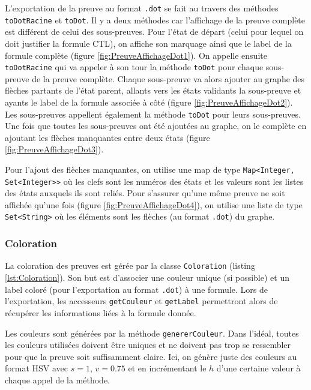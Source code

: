 \documentclass[dvipsnames]{report}
\begin{document}
L'exportation de la preuve au format \texttt{.dot} se fait au travers des méthodes \texttt{toDotRacine} et \texttt{toDot}. Il y a deux méthodes car l'affichage de la preuve complète est différent de celui des sous-preuves. Pour l'état de départ (celui pour lequel on doit justifier la formule CTL), on affiche son marquage ainsi que le label de la formule complète (figure \ref{fig:PreuveAffichageDot1}). On appelle ensuite \texttt{toDotRacine} qui va appeler à son tour la méthode \texttt{toDot} pour chaque sous-preuve de la preuve complète. Chaque sous-preuve va alors ajouter au graphe des flèches partants de l'état parent, allants vers les états validants la sous-preuve et ayants le label de la formule associée à côté (figure \ref{fig:PreuveAffichageDot2}). Les sous-preuves appellent également la méthode \texttt{toDot} pour leurs sous-preuves. Une fois que toutes les sous-preuves ont été ajoutées au graphe, on le complète en ajoutant les flèches manquantes entre deux états (figure \ref{fig:PreuveAffichageDot3}).



Pour l'ajout des flèches manquantes, on utilise une map de type \texttt{Map<Integer, {Set<Integer>}>} où les clefs sont les numéros des états et les valeurs sont les listes des états auxquels ils sont reliés. Pour s'assurer qu'une même preuve ne soit affichée qu'une fois (figure \ref{fig:PreuveAffichageDot4}), on utilise une liste de type \texttt{Set<String>} où les éléments sont les flèches (au format \texttt{.dot}) du graphe.



\subsubsection{Coloration}

La coloration des preuves est gérée par la classe \texttt{Coloration} (listing \ref{lst:Coloration}). Son but est d'associer une couleur unique (si possible) et un label coloré (pour l'exportation au format \texttt{.dot}) à une formule. Lors de l'exportation, les accesseurs \texttt{getCouleur} et \texttt{getLabel} permettront alors de récupérer les informations liées à la formule donnée.

Les couleurs sont générées par la méthode \texttt{genererCouleur}. Dans l'idéal, toutes les couleurs utilisées doivent être uniques et ne doivent pas trop se ressembler pour que la preuve soit suffisamment claire. Ici, on génère juste des couleurs au format HSV avec $s=1$, $v=0.75$ et en incrémentant le $h$ d'une certaine valeur à chaque appel de la méthode.
\end{document}
